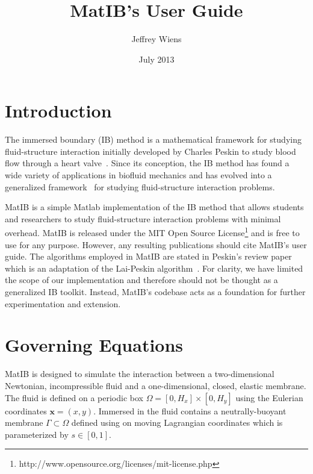 \documentclass{article}
\title{MatIB's User Guide}
\author{Jeffrey Wiens}
\date{July 2013}
\newcommand{\bs}[1]{\boldsymbol{#1}}
\begin{document}
\maketitle

\section{Introduction}\label{sec:intro}

The immersed boundary (IB) method is a mathematical framework for studying fluid-structure interaction  
initially developed by Charles Peskin to study blood flow through a heart valve~\cite{PeskinHearts}. 
Since its conception, the IB method has found a wide variety of applications in biofluid mechanics and has
evolved into a generalized framework~\cite{PeskinIB} for studying fluid-structure interaction problems. 

MatIB is a simple Matlab implementation of the IB method that allows students and researchers to 
study fluid-structure interaction problems with minimal overhead. MatIB is released under the 
MIT Open Source License\footnote{http://www.opensource.org/licenses/mit-license.php} and is free to use 
for any purpose. However, any resulting publications should cite MatIB's user guide.
The algorithms employed in MatIB are stated in Peskin's review paper~\cite{PeskinIB} 
which is an adaptation of the Lai-Peskin algorithm~\cite{LaiAlgorithm}. For clarity, we have limited 
the scope of our implementation and therefore should not be thought as a generalized IB toolkit. 
Instead, MatIB's codebase acts as a foundation for further experimentation and extension.

\section{Governing Equations}\label{sec:equations}

MatIB is designed to simulate the interaction between a two-dimensional Newtonian, incompressible fluid 
and a one-dimensional, closed, elastic membrane. The fluid is defined on a periodic box $\Omega = [0,H_x] \times [0,H_y]$
using the Eulerian coordinates $\bs{x} = (x,y)$. Immersed in the fluid contains a neutrally-buoyant membrane $\Gamma \subset \Omega$
defined using on moving Lagrangian coordinates which is parameterized by $s \in [0,1]$.
\end{document}

